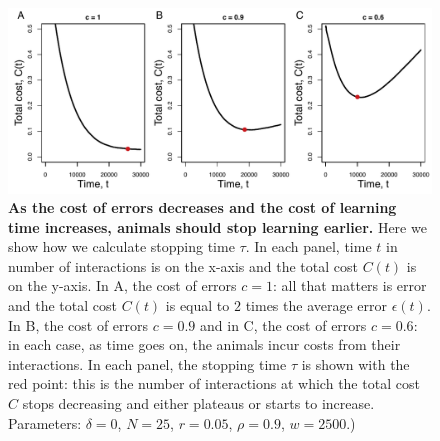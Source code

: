 \begin{figure}[ht]
\includegraphics[width=6.85in]{figures/stopping_time.pdf}
\caption{\sffamily\small\textbf{As the cost of errors decreases and the cost of learning time increases, animals should stop learning earlier.} Here we show how we calculate stopping time $\tau$. In each panel, time $t$ in number of interactions  is on the x-axis and the total cost $C(t)$ is on the y-axis. In A, the cost of errors $c=1$: all that matters is error and the total cost $C(t)$ is equal to $2$ times the average error $\epsilon(t)$. In B, the cost of errors $c=0.9$ and in C, the cost of errors $c=0.6$: in each case, as time goes on, the animals incur costs from their interactions. In each panel, the stopping time $\tau$ is shown with the red point: this is the number of interactions at which the total cost $C$ stops decreasing and either plateaus or starts to increase. Parameters: $\delta=0$, $N=25$, $r=0.05$, $\rho=0.9$, $w=2500$.)
}
\label{tau}
\end{figure}


